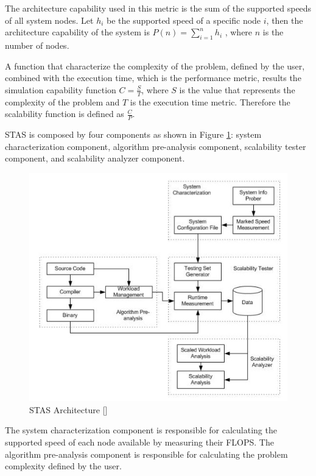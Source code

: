 The architecture capability used in this metric is the sum of the supported speeds of all system nodes. Let $h_{i}$ be the supported speed of a specific node $i$, then the architecture capability of the system is $P(n) = \sum_{i=1}^{n} h_i$ , where $n$ is the number of nodes. 

A function that characterize the complexity of the problem, defined by the user, combined with the execution time, which is the performance metric, results the simulation capability function $C = \frac{S}{T}$, where $S$ is the value that represents the complexity of the problem and $T$ is the execution time metric. Therefore the scalability function is defined as $\frac{C}{P}$.

STAS is composed by four components as shown in Figure \ref{stasarchitecture}: system characterization component, algorithm pre-analysis component, scalability tester component, and scalability analyzer component.

\begin{figure}[htbp]
\begin{center}
	\includegraphics[scale=0.6]{images/stasarchitecture}
\caption{STAS Architecture [\cite{STAS}]}
\label{stasarchitecture}
\end{center}
\end{figure}

The system characterization component is responsible for calculating the supported speed of each node available by measuring their FLOPS. The algorithm pre-analysis component is responsible for calculating the problem complexity defined by the user. 

